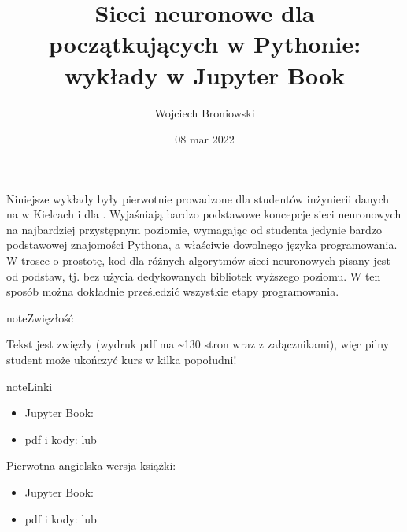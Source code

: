 \documentclass[a4paper,12pt,polish]{jupyterBook}
\title{Sieci neuronowe dla początkujących w Pythonie: wykłady w Jupyter Book}
\date{08 mar 2022}
\author{Wojciech Broniowski}
\begin{document}
\pagestyle{empty}
\sphinxmaketitle
\pagestyle{plain}
\sphinxtableofcontents
\pagestyle{normal}
\label{\detokenize{docs/index::doc}}




\sphinxAtStartPar
{}





\sphinxAtStartPar
Niniejsze wykłady były pierwotnie prowadzone dla studentów inżynierii danych na   w Kielcach i dla . Wyjaśniają bardzo podstawowe koncepcje sieci neuronowych na najbardziej przystępnym poziomie, wymagając od studenta jedynie bardzo podstawowej znajomości Pythona, a właściwie dowolnego języka programowania. W trosce o prostotę, kod dla różnych algorytmów sieci neuronowych pisany jest od podstaw, tj. bez użycia dedykowanych bibliotek wyższego poziomu. W ten sposób można dokładnie prześledzić wszystkie etapy programowania.

\begin{sphinxadmonition}{note}{Zwięzłość}

\sphinxAtStartPar
Tekst jest zwięzły (wydruk pdf ma \textasciitilde{}130 stron wraz z załącznikami), więc pilny student może ukończyć kurs w kilka popołudni!
\end{sphinxadmonition}

\begin{sphinxadmonition}{note}{Linki}
\begin{itemize}
\item {} 
\sphinxAtStartPar
Jupyter Book:

\item {} 
\sphinxAtStartPar
pdf i kody:  lub 

\end{itemize}

\sphinxAtStartPar
Pierwotna angielska wersja książki:
\begin{itemize}
\item {} 
\sphinxAtStartPar
Jupyter Book:

\item {} 
\sphinxAtStartPar
pdf i kody:  lub 

\end{itemize}
\end{sphinxadmonition}
\end{document}
